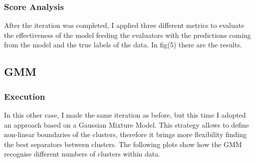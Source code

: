 \documentclass{article}
\begin{document}
				


				\subsubsection{Score Analysis}
				After the iteration was completed, I applied three different metrics to evaluate the effectiveness of the model feeding the evaluators with the predictions coming from the model and the true labels of the data.
				In fig(5) there are the results.
				
				\subsection{GMM}
				\subsubsection{Execution}
				In this other case, I made the same iteration as before, but this time I adopted an approach based on a Gaussian Mixture Model. This strategy allows to define non-linear boundaries of the clusters, therefore it brings more flexibility finding the best separators between clusters. The following plots show how the GMM recognise different numbers of clusters within data.
\end{document}
